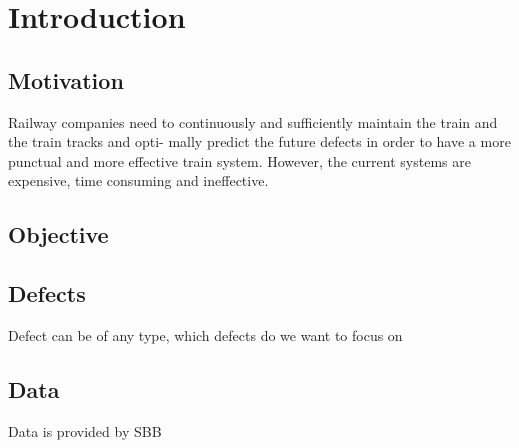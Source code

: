 



%



\maketitle

%
{
  \hypersetup{linkcolor=black}
  \tableofcontents
   
}
\newpage
\chapter{Introduction}
\section{Motivation}
Railway companies need to continuously and sufficiently maintain the train and the train tracks and opti- mally predict the future defects in order to have a more punctual and more effective train system. However, the current systems are expensive, time consuming and ineffective.


\section{Objective}

\section{Defects}
Defect can be of any type, which defects do we want to focus on
\section{Data}
Data is provided by SBB

